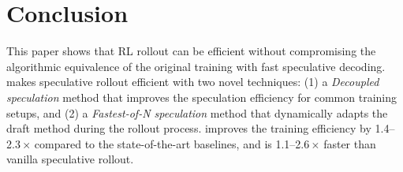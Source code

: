 \section{Conclusion}
\label{sec:concl}

\noindent
This paper shows that RL rollout can be efficient 
without compromising the algorithmic equivalence of the original training with 
fast speculative decoding. 
{\sys} makes speculative rollout efficient with two novel techniques: 
(1) a \emph{Decoupled speculation} method that improves the speculation efficiency 
for common training setups, 
and (2) a \emph{Fastest-of-N speculation} method that 
dynamically adapts the draft method
during the rollout process.
{\sys} improves the training efficiency by {1.4--2.3}\,$\times$ compared to the state-of-the-art baselines,
and is {1.1--2.6}\,$\times$ faster than vanilla speculative rollout.
